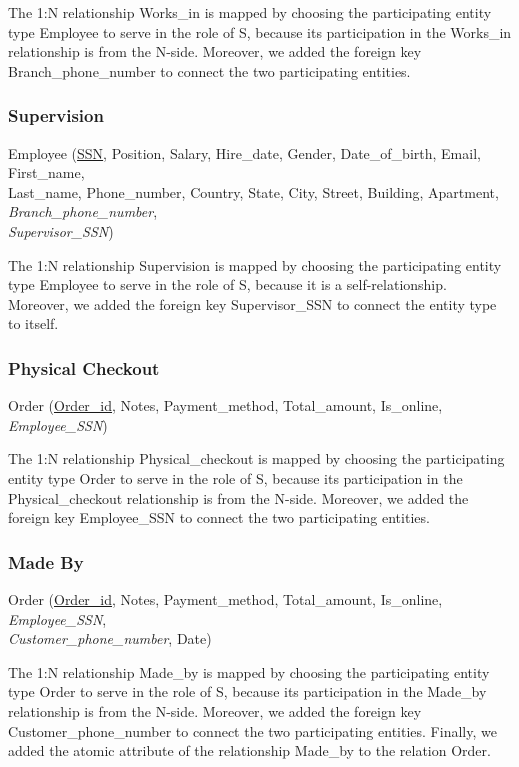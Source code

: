 The 1:N relationship Works\_in is mapped by choosing the participating entity type Employee to serve in the role of S, because its participation in the Works\_in relationship is from the N-side. Moreover, we added the foreign key Branch\_phone\_number to connect the two participating entities.

\subsubsection{Supervision}

Employee (\underline{SSN}, Position, Salary, Hire\_date, Gender, Date\_of\_birth, Email, First\_name, \\
Last\_name, Phone\_number, Country, State, City, Street, Building, Apartment, \textit{Branch\_phone\_number}, \\
\textit{Supervisor\_SSN})

The 1:N relationship Supervision is mapped by choosing the participating entity type Employee to serve in the role of S, because it is a self-relationship. Moreover, we added the foreign key Supervisor\_SSN to connect the entity type to itself.

\subsubsection{Physical Checkout}

Order (\underline{Order\_id}, Notes, Payment\_method, Total\_amount, Is\_online, \textit{Employee\_SSN})

The 1:N relationship Physical\_checkout is mapped by choosing the participating entity type Order to serve in the role of S, because its participation in the Physical\_checkout relationship is from the N-side. Moreover, we added the foreign key Employee\_SSN to connect the two participating entities.

\subsubsection{Made By}

Order (\underline{Order\_id}, Notes, Payment\_method, Total\_amount, Is\_online, \textit{Employee\_SSN}, \\
\textit{Customer\_phone\_number}, Date)

The 1:N relationship Made\_by is mapped by choosing the participating entity type Order to serve in the role of S, because its participation in the Made\_by relationship is from the N-side. Moreover, we added the foreign key Customer\_phone\_number to connect the two participating entities. Finally, we added the atomic attribute of the relationship Made\_by to the relation Order.

